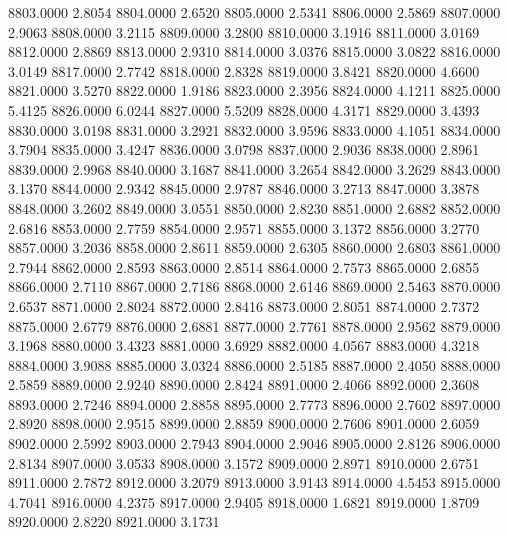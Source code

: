 8803.0000      2.8054
8804.0000      2.6520
8805.0000      2.5341
8806.0000      2.5869
8807.0000      2.9063
8808.0000      3.2115
8809.0000      3.2800
8810.0000      3.1916
8811.0000      3.0169
8812.0000      2.8869
8813.0000      2.9310
8814.0000      3.0376
8815.0000      3.0822
8816.0000      3.0149
8817.0000      2.7742
8818.0000      2.8328
8819.0000      3.8421
8820.0000      4.6600
8821.0000      3.5270
8822.0000      1.9186
8823.0000      2.3956
8824.0000      4.1211
8825.0000      5.4125
8826.0000      6.0244
8827.0000      5.5209
8828.0000      4.3171
8829.0000      3.4393
8830.0000      3.0198
8831.0000      3.2921
8832.0000      3.9596
8833.0000      4.1051
8834.0000      3.7904
8835.0000      3.4247
8836.0000      3.0798
8837.0000      2.9036
8838.0000      2.8961
8839.0000      2.9968
8840.0000      3.1687
8841.0000      3.2654
8842.0000      3.2629
8843.0000      3.1370
8844.0000      2.9342
8845.0000      2.9787
8846.0000      3.2713
8847.0000      3.3878
8848.0000      3.2602
8849.0000      3.0551
8850.0000      2.8230
8851.0000      2.6882
8852.0000      2.6816
8853.0000      2.7759
8854.0000      2.9571
8855.0000      3.1372
8856.0000      3.2770
8857.0000      3.2036
8858.0000      2.8611
8859.0000      2.6305
8860.0000      2.6803
8861.0000      2.7944
8862.0000      2.8593
8863.0000      2.8514
8864.0000      2.7573
8865.0000      2.6855
8866.0000      2.7110
8867.0000      2.7186
8868.0000      2.6146
8869.0000      2.5463
8870.0000      2.6537
8871.0000      2.8024
8872.0000      2.8416
8873.0000      2.8051
8874.0000      2.7372
8875.0000      2.6779
8876.0000      2.6881
8877.0000      2.7761
8878.0000      2.9562
8879.0000      3.1968
8880.0000      3.4323
8881.0000      3.6929
8882.0000      4.0567
8883.0000      4.3218
8884.0000      3.9088
8885.0000      3.0324
8886.0000      2.5185
8887.0000      2.4050
8888.0000      2.5859
8889.0000      2.9240
8890.0000      2.8424
8891.0000      2.4066
8892.0000      2.3608
8893.0000      2.7246
8894.0000      2.8858
8895.0000      2.7773
8896.0000      2.7602
8897.0000      2.8920
8898.0000      2.9515
8899.0000      2.8859
8900.0000      2.7606
8901.0000      2.6059
8902.0000      2.5992
8903.0000      2.7943
8904.0000      2.9046
8905.0000      2.8126
8906.0000      2.8134
8907.0000      3.0533
8908.0000      3.1572
8909.0000      2.8971
8910.0000      2.6751
8911.0000      2.7872
8912.0000      3.2079
8913.0000      3.9143
8914.0000      4.5453
8915.0000      4.7041
8916.0000      4.2375
8917.0000      2.9405
8918.0000      1.6821
8919.0000      1.8709
8920.0000      2.8220
8921.0000      3.1731
